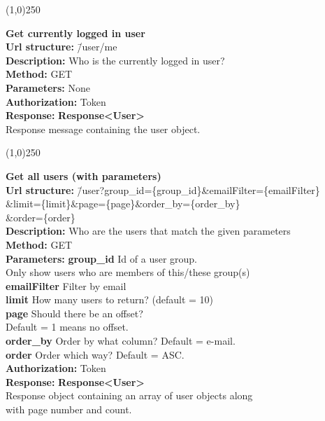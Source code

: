 \documentclass[11pt]{article}
\begin{document}
\begin{center}\line(1,0){250}\end{center}

\begin{tabbing}
\textbf{Get currently logged in user} \\
\textcolor{black!60}{\textbf{Url structure:}} \hspace{0.2in} \= /user/me \\
\textcolor{black!60}{\textbf{Description:}}  \> Who is the currently logged in user? \\
\textcolor{black!60}{\textbf{Method:}} \> GET \\
\textcolor{black!60}{\textbf{Parameters:}}  \> None \\
\textcolor{black!60}{\textbf{Authorization:}} \> Token \\
\textcolor{black!60}{\textbf{Response:}} \> \textbf{Response<User>} \\
\> Response message containing the user object.
\end{tabbing}

\begin{center}\line(1,0){250}\end{center}

\begin{tabbing}
\textbf{Get all users (with parameters)} \\
\textcolor{black!60}{\textbf{Url structure:}} \hspace{0.2in} \= /user?group\_id=\{group\_id\}\&emailFilter=\{emailFilter\}
\\ \> \&limit=\{limit\}\&page=\{page\}\&order\_by=\{order\_by\} \\ \>
\&order=\{order\} \\
\textcolor{black!60}{\textbf{Description:}}  \> Who are the users that match the given parameters \\
\textcolor{black!60}{\textbf{Method:}} \> GET \\
\textcolor{black!60}{\textbf{Parameters:}} \> \textbf{group\_id} Id of a user group. \\ \> Only show users who are members of this/these group(s) \\
\> \textbf{emailFilter} Filter by email \\
\> \textbf{limit} How many users to return? (default = 10) \\
\> \textbf{page} Should there be an offset? \\
\> Default = 1 means no offset. \\
\> \textbf{order\_by} Order by what column? Default = e-mail. \\
\> \textbf{order} Order which way? Default = ASC. \\
\textcolor{black!60}{\textbf{Authorization:}} \> Token \\
\textcolor{black!60}{\textbf{Response:}} \> \textbf{Response<User>} \\
\> Response object containing an array of user objects along \\ \> with page number and count.
\end{tabbing}
\end{document}
